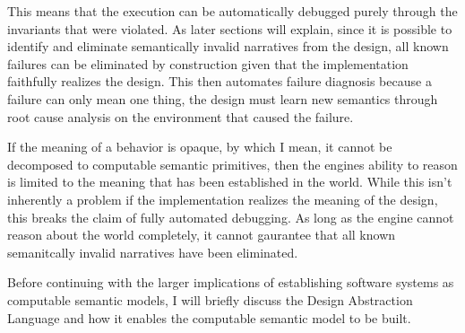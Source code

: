 This means that the execution can be automatically debugged purely through the invariants that were violated. As later sections will explain, since it is possible to identify and eliminate semantically invalid narratives from the design, all known failures can be eliminated by construction given that the implementation faithfully realizes the design. This then automates failure diagnosis because a failure can only mean one thing, the design must learn new semantics through root cause analysis on the environment that caused the failure.

If the meaning of a behavior is opaque, by which I mean, it cannot be decomposed to computable semantic primitives, then the engines ability to reason is limited to the meaning that has been established in the world. While this isn't inherently a problem if the implementation realizes the meaning of the design, this breaks the claim of fully automated debugging. As long as the engine cannot reason about the world completely, it cannot gaurantee that all known semanitcally invalid narratives have been eliminated.

Before continuing with the larger implications of establishing software systems as computable semantic models, I will briefly discuss the Design Abstraction Language and how it enables the computable semantic model to be built.


